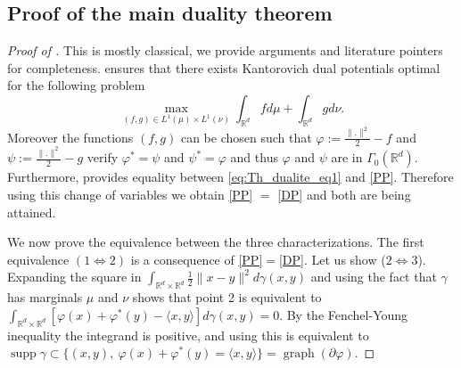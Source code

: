 \documentclass[11pt]{article}
\DeclareMathOperator{\supp}{supp}
\DeclareMathOperator{\graph}{graph}
\newcommand{\R}{\mathbb R}
\newcommand{\1}{\mathbbm{1}}
\numberwithin{equation}{section}
\begin{document}
\subsection{Proof of the main duality theorem}
\label{sec:proogTheoremClassicalDuality}
\begin{proof}[Proof of ]
    This is mostly classical, we provide arguments and literature pointers for completeness.
    \cite[Theorem 1.40]{book_santambrogio} ensures that there exists Kantorovich dual potentials optimal for the following problem
     \begin{equation}\label{eq:Th_dualite_eq1}
        \max_{(f,g)\in L^1(\mu)\times L^1(\nu)}\int_{\R^d}fd\mu+\int_{\R^d}gd\nu.
    \end{equation}
    Moreover the functions $(f,g)$ can be chosen such that $\varphi:=\frac{\|.\|^2}{2}-f$ and $\psi:=\frac{\|.\|^2}{2}-g$ verify $\varphi^*=\psi$ and $\psi^*=\varphi$ and thus $\varphi$ and $\psi$ are in $\Gamma_0(\R^d)$. Furthermore,  \cite[Theorem 1.40]{book_santambrogio} provides equality between \eqref{eq:Th_dualite_eq1} and \eqref{PP}. Therefore using this change of variables we obtain \eqref{PP} $=$ \eqref{DP} and both are being attained. 
    
    We now prove the equivalence between the three characterizations. The first equivalence $(1 \iff 2)$ is a consequence of \eqref{PP}$=$\eqref{DP}. 
    Let us show ($2 \iff 3$). Expanding the square in $\int_{\R^d\times\R^d}\frac{1}{2}\|x-y\|^2d\gamma(x,y)$ and using the fact that $\gamma$ has marginals $\mu$ and $\nu$ shows that point 2 is equivalent to  $\int_{\R^d\times\R^d}[\varphi(x)+\varphi^*(y)-\langle x,y \rangle ]d\gamma(x,y)=0$. By the Fenchel-Young inequality the integrand is positive, and using  this is equivalent to $\supp \gamma \subset \{(x,y),\:\varphi(x)+\varphi^*(y)=\langle x,y \rangle\} = \graph(\partial\varphi)$. 
    

\end{proof}
\end{document}
